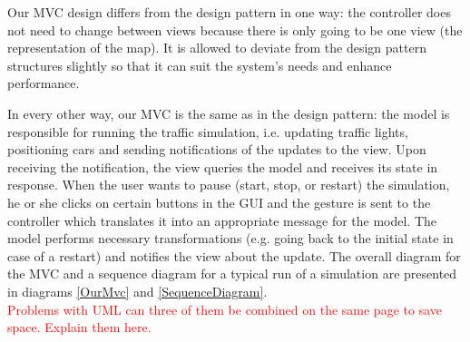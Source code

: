\documentclass{article}
\begin{document}
%	
	
	
	Our MVC design differs from the design pattern in one way: the controller does not need to change between views because there is only going to be one view (the representation of the map). 
	It is allowed to deviate from the design pattern structures slightly so that it can suit the system's needs and enhance performance. 
	
	In every other way, our MVC is the same as in the design pattern: the model is responsible for running the traffic simulation, i.e. updating traffic lights, positioning cars and sending notifications of the updates to the view. Upon receiving the notification, the view queries the model and receives its state in response. 
	When the user wants to pause (start, stop, or restart) the simulation, he or she clicks on certain buttons in the GUI and the gesture is sent to the controller which translates it into an appropriate message for the model. 
	The model performs necessary transformations (e.g. going back to the initial state in case of a restart) and notifies the view about the update. 
	The overall diagram for the MVC and a sequence diagram for a typical run of a simulation are presented in diagrams \ref{OurMvc} and \ref{SequenceDiagram}. \\
	
	\textcolor{red}{Problems with UML can three of them be combined on the same page to save space. Explain them here.}
    
\end{document}

